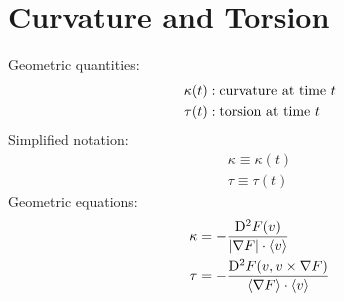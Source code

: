 \section{Curvature and Torsion}


Geometric quantities:
\begin{subequations}
\begin{align}
\kappa( t )  &:  \text{curvature at time $ t $}\\
\tau( t )    &:  \text{torsion at time $ t $}
\end{align}
\end{subequations}
Simplified notation:
\begin{subequations}
\begin{align}
\kappa  \equiv  \kappa( t )\\
\tau    \equiv  \tau( t )
\end{align}
\end{subequations}
Geometric equations:
\begin{subequations}
\begin{align}
\kappa   &=   -\frac{ \mathrm{D}^{  2  } F ( v ) }{ \lvert  \nabla F   \rvert \cdot \langle  v  \rangle }\\
\tau     &=   -\frac{ \mathrm{D}^{  2  } F ( v, v \times \nabla F  ) }{ \langle  \nabla F   \rangle \cdot \langle  v  \rangle }
\end{align}
\end{subequations}
